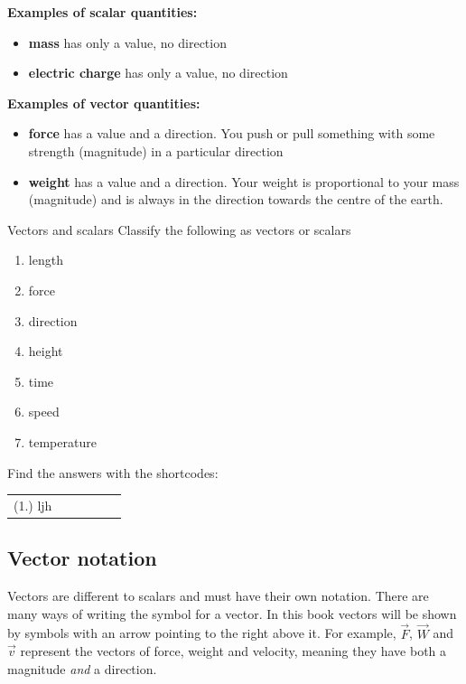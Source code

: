 \textbf{Examples of scalar quantities:}
\begin{itemize}
\item \textbf{mass} has only a value, no direction
\item \textbf{electric charge} has only a value, no direction
\end{itemize}

\textbf{Examples of vector quantities:} 
\begin{itemize}
\item \textbf{force} has a value and a direction. You push or pull something with some strength (magnitude) in a particular direction 
\item \textbf{weight} has a value and a direction. Your weight is proportional to your mass (magnitude) and is always in the direction towards the centre of the earth.
\end{itemize}

\begin{exercises}{Vectors and scalars}
Classify the following as vectors or scalars
 \begin{enumerate}[noitemsep,label=\textbf{\arabic*}.]
\item length
\item force
\item direction
\item height
\item time
\item speed
\item temperature
 \end{enumerate}
\par {} Find the answers with the shortcodes:
 \par \begin{tabular}[h]{cccccc}
 (1.) ljh   \end{tabular}
\end{exercises}

    \label{m38812*cid4}
      \label{m38812*uid1}
\subsection*{Vector notation}
            \nopagebreak
Vectors are different to scalars and must have their own notation. There are many ways of writing the symbol for a vector. In this book vectors will be shown by symbols with an arrow pointing to the right above it. For example, $\stackrel{\to }{F}$, $\stackrel{\to }{W}$ and $\stackrel{\to }{v}$ represent the vectors of force, weight and velocity, meaning they have both a magnitude \textit{and} a direction.

